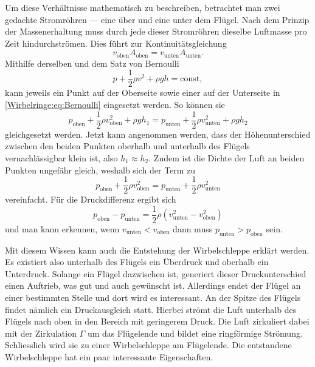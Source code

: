 Um diese Verhältnisse mathematisch zu beschreiben, betrachtet man zwei gedachte Stromröhren --- eine über und eine unter dem Flügel. 
Nach dem Prinzip der Massenerhaltung muss durch jede dieser Stromröhren dieselbe Luftmasse pro Zeit hindurchströmen. Dies führt zur Kontinuitätsgleichung
\begin{equation*}
v_{\text{oben}}A_{\text{oben}} 
=
v_{\text{unten}}A_{\text{unten}}.
\end{equation*}
Mithilfe derselben und dem Satz von Bernoulli
\begin{equation}
    p+\frac{1}{2}\rho v^2+\rho gh
    =
    \text{const}
    \label{Wirbelringe:eq:Bernoulli},
\end{equation}
kann jeweils ein Punkt auf der Oberseite sowie einer auf der Unterseite in \eqref{Wirbelringe:eq:Bernoulli} eingesetzt werden.
So können sie 
\begin{equation*}
p_{\text{oben}}+\frac{1}{2}\rho v^2_{\text{oben}} + \rho gh_1 
=
p_{\text{unten}}+\frac{1}{2}\rho v^2_{\text{unten}}+\rho gh_2
\end{equation*}
gleichgesetzt werden.
Jetzt kann angenommen werden, dass der Höhenunterschied zwischen den beiden Punkten oberhalb und unterhalb des Flügels vernachlässigbar klein ist, also \(h_1\approx h_2\).
Zudem ist die Dichte der Luft an beiden Punkten ungefähr gleich, weshalb sich der Term zu 
\begin{equation*}
p_{\text{oben}}+\frac{1}{2}\rho v^2_{\text{oben}} 
=
p_{\text{unten}}+\frac{1}{2}\rho v^2_{\text{unten}}
\end{equation*}
vereinfacht.
Für die Druckdifferenz ergibt sich
\begin{equation*}
p_{\text{oben}}-p_{\text{unten}} 
=
\frac{1}{2}\rho( v^2_{\text{unten}}-v^2_{\text{oben}})
\end{equation*}
und man kann erkennen, wenn \(v_{\text{unten}} < v_{\text{oben}}\) dann muss \(p_{\text{unten}} > p_{\text{oben}}\) sein.

Mit diesem Wissen kann auch die Entstehung der Wirbelschleppe erklärt werden. 
Es existiert also unterhalb des Flügels ein Überdruck und oberhalb ein Unterdruck.
Solange ein Flügel dazwischen ist, generiert dieser Druckunterschied einen Auftrieb, was gut und auch gewünscht ist.
Allerdings endet der Flügel an einer bestimmten Stelle und dort wird es interessant.
An der Spitze des Flügels findet nämlich ein Druckausgleich statt.
Hierbei strömt die Luft unterhalb des Flügels nach oben in den Bereich mit geringerem Druck. 
Die Luft zirkuliert dabei mit der Zirkulation \(\Gamma\) um das Flügelende und bildet eine ringförmige Strömung.
Schliesslich wird sie zu einer Wirbelschleppe am Flügelende.
Die entstandene Wirbelschleppe hat ein paar interessante Eigenschaften.

